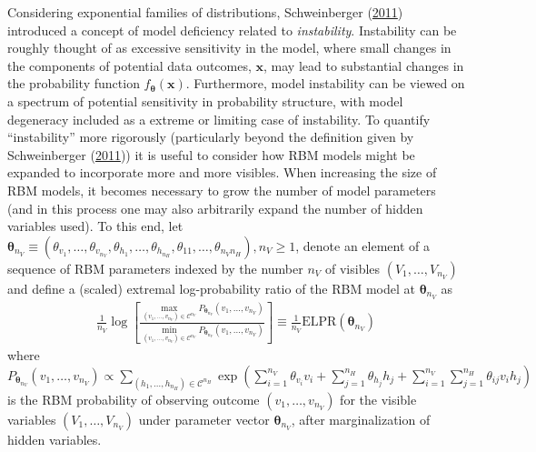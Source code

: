 \documentclass[12pt]{article}
\theoremstyle{definition}
\newcommand{\nv}{{n_{\scriptscriptstyle V}}}
\newcommand{\nh}{{n_{\scriptscriptstyle H}}}
\begin{document}
Considering exponential families of distributions, Schweinberger
(\protect\hyperlink{ref-schweinberger2011instability}{2011}) introduced
a concept of model deficiency related to \emph{instability}. Instability
can be roughly thought of as excessive sensitivity in the model, where
small changes in the components of potential data outcomes,
\(\boldsymbol x\), may lead to substantial changes in the probability
function \(f_{\boldsymbol \theta}(\boldsymbol x)\). Furthermore, model
instability can be viewed on a spectrum of potential sensitivity in
probability structure, with model degeneracy included as a extreme or
limiting case of instability. To quantify ``instability'' more
rigorously (particularly beyond the definition given by Schweinberger
(\protect\hyperlink{ref-schweinberger2011instability}{2011})) it is
useful to consider how RBM models might be expanded to incorporate more
and more visibles. When increasing the size of RBM models, it becomes
necessary to grow the number of model parameters (and in this process
one may also arbitrarily expand the number of hidden variables used). To
this end, let
\(\boldsymbol \theta_{\nv} \equiv (\theta_{v_1}, \dots, \theta_{v_\nv}, \theta_{h_1}, \dots, \theta_{h_\nh}, \theta_{11}, \dots, \theta_{\nv \nh}), \nv \ge 1\),
denote an element of a sequence of RBM parameters indexed by the number
\(\nv\) of visibles \((V_1, \dots, V_\nv)\) and define a (scaled)
extremal log-probability ratio of the RBM model at
\(\boldsymbol \theta_{\nv}\) as
\begin{align}
\frac{1}{\nv} \log \left[\frac{\max\limits_{(v_1, \dots, v_\nv) \in \mathcal{C}^\nv}P_{\boldsymbol \theta_\nv}(v_1, \dots, v_\nv)}{\min\limits_{(v_1, \dots, v_\nv) \in \mathcal{C}^\nv}P_{\boldsymbol \theta_\nv}(v_1, \dots, v_\nv)}\right] \equiv \frac{1}{\nv} \text{ELPR}(\boldsymbol \theta_\nv) \label{eq:elpr}
\end{align}
where
\(P_{\boldsymbol \theta_\nv}(v_1, \dots, v_\nv) \propto \sum_{(h_1, \dots, h_\nh) \in \mathcal{C}^\nh}\exp\left(\sum_{i = 1}^\nv \theta_{v_i} v_i + \sum_{j = 1}^\nh \theta_{h_j} h_j + \sum_{i = 1}^\nv \sum_{j = 1}^\nh \theta_{ij} v_i h_j\right)\)
is the RBM probability of observing outcome \((v_1, \dots, v_\nv)\) for
the visible variables \((V_1, \dots, V_\nv)\) under parameter vector
\(\boldsymbol \theta_\nv\), after marginalization of hidden variables.
\end{document}
